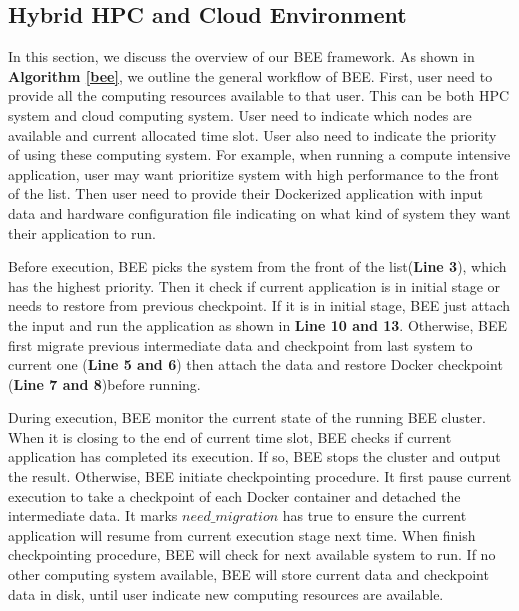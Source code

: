 \subsection{Hybrid HPC and Cloud Environment}

In this section, we discuss the overview of our BEE framework. As shown in \textbf{Algorithm \ref{bee}}, we outline the general workflow of BEE. First, user need to provide all the computing resources available to that user. This can be both HPC system and cloud computing system. User need to indicate which nodes are available and current allocated time slot. User also need to indicate the priority of using these computing system. For example, when running a compute intensive application, user may want prioritize system with high performance to the front of the list. Then user need to provide their Dockerized application with input data and hardware configuration file indicating on what kind of system they want their application to run. 

Before execution, BEE picks the system from the front of the list(\textbf{Line 3}), which has the highest priority. Then it check if current application is in initial stage or needs to restore from previous checkpoint. If it is in initial stage, BEE just attach the input and run the application as shown in \textbf{Line 10 and 13}. Otherwise, BEE first migrate previous intermediate data and checkpoint from last system to current one (\textbf{Line 5 and 6}) then attach the data and restore Docker checkpoint (\textbf{Line 7 and 8})before running. 

During execution, BEE monitor the current state of the running BEE cluster. When it is closing to the end of current time slot, BEE checks if current application has completed its execution. If so, BEE stops the cluster and output the result. Otherwise, BEE initiate checkpointing procedure. It first pause current execution to take a checkpoint of each Docker container and detached the intermediate data. It marks $need\_migration$ has true to ensure the current application will resume from current execution stage next time. When finish checkpointing procedure, BEE will check for next available system to run. If no other computing system available, BEE will store current data and checkpoint data in disk, until user indicate new computing resources are available.
	

